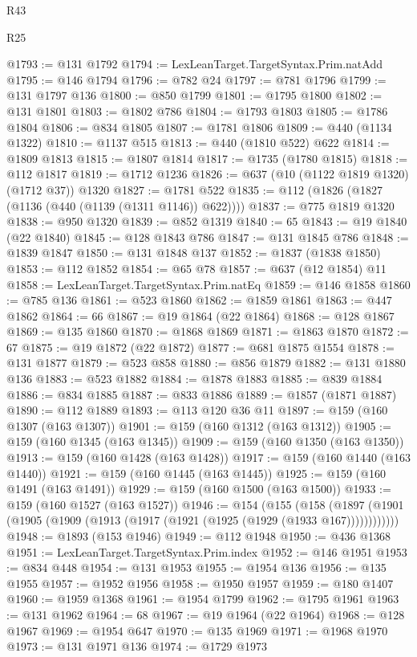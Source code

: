 \begin{lexlean}{R43}
\begin{lexlean}{R25}
\begin{coremodule}
{{{{{{{{{{{{{{{{{{{{{{{{{{{{{{{{{{{{{{{{{{{{{{{{{{{{{{{{{{{{{{{{{{{{{{{{{{{{{{{{{{{{{{{{{{{{{{{{{{{{{{{{{{{{{{{{{{{{{{{{{{{{{{{{{{{{{{{{{{{{{{{{{{{{{{{{{{{{{{{{{{{{{{{{{{{{{{{{{{{{{{{{{{{{{{{{{@1793 := @131 @1792
@1794 := LexLeanTarget.TargetSyntax.Prim.natAdd
@1795 := @146 @1794
@1796 := @782 @24
@1797 := @781 @1796
@1799 := @131 @1797 @136
@1800 := @850 @1799
@1801 := @1795 @1800
@1802 := @131 @1801
@1803 := @1802 @786
@1804 := @1793 @1803
@1805 := @1786 @1804
@1806 := @834 @1805
@1807 := @1781 @1806
@1809 := @440 (@1134 @1322)
@1810 := @1137 @515
@1813 := @440 (@1810 @522) @622
@1814 := @1809 @1813
@1815 := @1807 @1814
@1817 := @1735 (@1780 @1815)
@1818 := @112 @1817
@1819 := @1712 @1236
@1826 := @637 (@10 (@1122 @1819 @1320) (@1712 @37)) @1320
@1827 := @1781 @522
@1835 := @112 (@1826 (@1827 (@1136 (@440 (@1139 (@1311 @1146)) @622))))
@1837 := @775 @1819 @1320
@1838 := @950 @1320
@1839 := @852 @1319
@1840 := 65
@1843 := @19 @1840 (@22 @1840)
@1845 := @128 @1843 @786
@1847 := @131 @1845 @786
@1848 := @1839 @1847
@1850 := @131 @1848 @137
@1852 := @1837 (@1838 @1850)
@1853 := @112 @1852
@1854 := @65 @78
@1857 := @637 (@12 @1854) @11
@1858 := LexLeanTarget.TargetSyntax.Prim.natEq
@1859 := @146 @1858
@1860 := @785 @136
@1861 := @523 @1860
@1862 := @1859 @1861
@1863 := @447 @1862
@1864 := 66
@1867 := @19 @1864 (@22 @1864)
@1868 := @128 @1867
@1869 := @135 @1860
@1870 := @1868 @1869
@1871 := @1863 @1870
@1872 := 67
@1875 := @19 @1872 (@22 @1872)
@1877 := @681 @1875 @1554
@1878 := @131 @1877
@1879 := @523 @858
@1880 := @856 @1879
@1882 := @131 @1880 @136
@1883 := @523 @1882
@1884 := @1878 @1883
@1885 := @839 @1884
@1886 := @834 @1885
@1887 := @833 @1886
@1889 := @1857 (@1871 @1887)
@1890 := @112 @1889
@1893 := @113 @120 @36 @11
@1897 := @159 (@160 @1307 (@163 @1307))
@1901 := @159 (@160 @1312 (@163 @1312))
@1905 := @159 (@160 @1345 (@163 @1345))
@1909 := @159 (@160 @1350 (@163 @1350))
@1913 := @159 (@160 @1428 (@163 @1428))
@1917 := @159 (@160 @1440 (@163 @1440))
@1921 := @159 (@160 @1445 (@163 @1445))
@1925 := @159 (@160 @1491 (@163 @1491))
@1929 := @159 (@160 @1500 (@163 @1500))
@1933 := @159 (@160 @1527 (@163 @1527))
@1946 := @154
    (@155
      (@158 (@1897 (@1901 (@1905 (@1909 (@1913 (@1917 (@1921 (@1925 (@1929 (@1933 @167))))))))))))
@1948 := @1893 (@153 @1946)
@1949 := @112 @1948
@1950 := @436 @1368
@1951 := LexLeanTarget.TargetSyntax.Prim.index
@1952 := @146 @1951
@1953 := @834 @448
@1954 := @131 @1953
@1955 := @1954 @136
@1956 := @135 @1955
@1957 := @1952 @1956
@1958 := @1950 @1957
@1959 := @180 @1407
@1960 := @1959 @1368
@1961 := @1954 @1799
@1962 := @1795 @1961
@1963 := @131 @1962
@1964 := 68
@1967 := @19 @1964 (@22 @1964)
@1968 := @128 @1967
@1969 := @1954 @647
@1970 := @135 @1969
@1971 := @1968 @1970
@1973 := @131 @1971 @136
@1974 := @1729 @1973
}}}}}}}}}}}}}}}}}}}}}}}}}}}}}}}}}}}}}}}}}}}}}}}}}}}}}}}}}}}}}}}}}}}}}}}}}}}}}}}}}}}}}}}}}}}}}}}}}}}}}}}}}}}}}}}}}}}}}}}}}}}}}}}}}}}}}}}}}}}}}}}}}}}}}}}}}}}}}}}}}}}}}}}}}}}}}}}}}}}}}}}}}}}}}}}}}
\end{coremodule}
\end{lexlean}
\end{lexlean}
